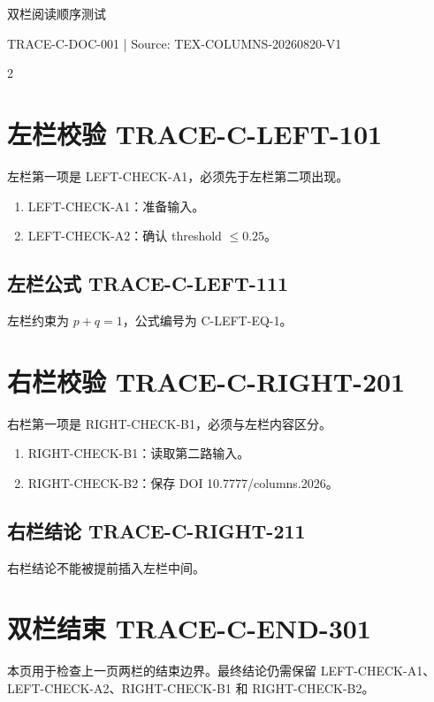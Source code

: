 \documentclass[11pt,a4paper]{ctexart}
\begin{document}
\begin{center}
{\LARGE 双栏阅读顺序测试}\par
{\small TRACE-C-DOC-001 | Source: TEX-COLUMNS-20260820-V1}
\end{center}

\begin{multicols}{2}
\section{左栏校验 TRACE-C-LEFT-101}
左栏第一项是 LEFT-CHECK-A1，必须先于左栏第二项出现。
\begin{enumerate}
  \item LEFT-CHECK-A1：准备输入。
  \item LEFT-CHECK-A2：确认 threshold $\leq 0.25$。
\end{enumerate}
\subsection{左栏公式 TRACE-C-LEFT-111}
左栏约束为 $p+q=1$，公式编号为 C-LEFT-EQ-1。

\columnbreak
\section{右栏校验 TRACE-C-RIGHT-201}
右栏第一项是 RIGHT-CHECK-B1，必须与左栏内容区分。
\begin{enumerate}
  \item RIGHT-CHECK-B1：读取第二路输入。
  \item RIGHT-CHECK-B2：保存 DOI 10.7777/columns.2026。
\end{enumerate}
\subsection{右栏结论 TRACE-C-RIGHT-211}
右栏结论不能被提前插入左栏中间。
\end{multicols}

\newpage
\section{双栏结束 TRACE-C-END-301}
本页用于检查上一页两栏的结束边界。最终结论仍需保留 LEFT-CHECK-A1、LEFT-CHECK-A2、RIGHT-CHECK-B1 和 RIGHT-CHECK-B2。
\end{document}
